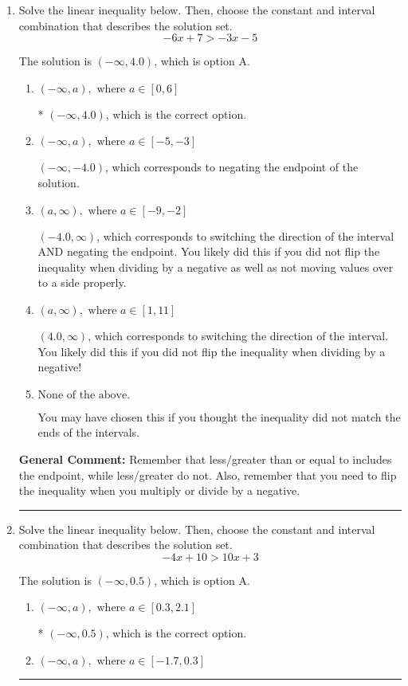 \documentclass{extbook}[14pt]
\newcommand{\litem}[1]{\item #1

\rule{\textwidth}{0.4pt}}
\begin{document}
\begin{enumerate}\litem{
Solve the linear inequality below. Then, choose the constant and interval combination that describes the solution set.
\[ -6x + 7 > -3x -5 \]

The solution is \( (-\infty, 4.0) \), which is option A.\begin{enumerate}[label=\Alph*.]
\item \( (-\infty, a), \text{ where } a \in [0, 6] \)

* $(-\infty, 4.0)$, which is the correct option.
\item \( (-\infty, a), \text{ where } a \in [-5, -3] \)

 $(-\infty, -4.0)$, which corresponds to negating the endpoint of the solution.
\item \( (a, \infty), \text{ where } a \in [-9, -2] \)

 $(-4.0, \infty)$, which corresponds to switching the direction of the interval AND negating the endpoint. You likely did this if you did not flip the inequality when dividing by a negative as well as not moving values over to a side properly.
\item \( (a, \infty), \text{ where } a \in [1, 11] \)

 $(4.0, \infty)$, which corresponds to switching the direction of the interval. You likely did this if you did not flip the inequality when dividing by a negative!
\item \( \text{None of the above}. \)

You may have chosen this if you thought the inequality did not match the ends of the intervals.
\end{enumerate}

\textbf{General Comment:} Remember that less/greater than or equal to includes the endpoint, while less/greater do not. Also, remember that you need to flip the inequality when you multiply or divide by a negative.
}
\litem{
Solve the linear inequality below. Then, choose the constant and interval combination that describes the solution set.
\[ -4x + 10 > 10x + 3 \]

The solution is \( (-\infty, 0.5) \), which is option A.\begin{enumerate}[label=\Alph*.]
\item \( (-\infty, a), \text{ where } a \in [0.3, 2.1] \)

* $(-\infty, 0.5)$, which is the correct option.
\item \( (-\infty, a), \text{ where } a \in [-1.7, 0.3] \)


\end{enumerate}}
\end{enumerate}
\end{document}
